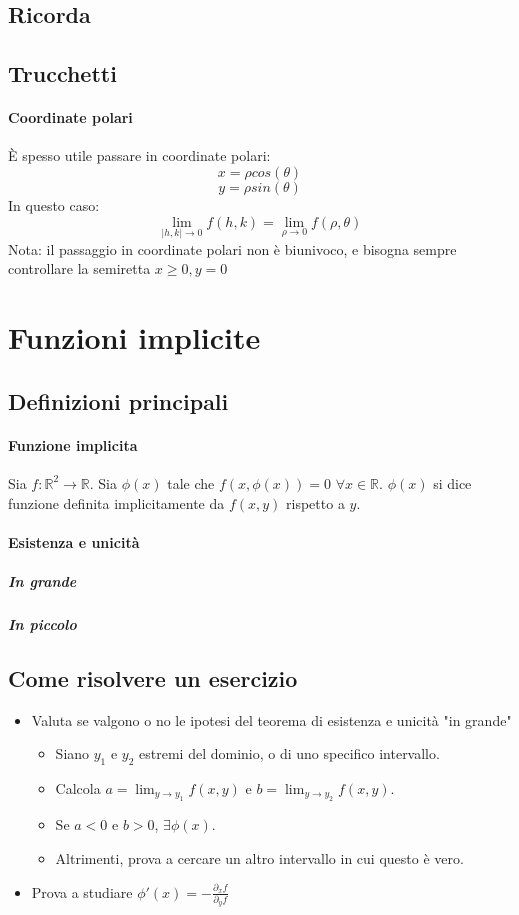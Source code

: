 \documentclass[a4paper,10pt]{book}
\begin{document}
\subsection{Ricorda}
\subsection{Trucchetti}

\paragraph{Coordinate polari}
È spesso utile passare in coordinate polari: $$ x = \rho cos(\theta)$$ $$ y = \rho sin(\theta) $$
In questo caso: $$ \lim_{|h,k| \to 0} f(h, k) = \lim_{\rho \to 0} f(\rho, \theta)$$
Nota: il passaggio in coordinate polari non è biunivoco, e bisogna sempre controllare la semiretta $x\geq0, y=0$

\section{Funzioni implicite}
\subsection{Definizioni principali}
\paragraph{Funzione implicita}
Sia $f: \mathbb{R}^2 \rightarrow \mathbb{R}$.
Sia $\phi(x)$ tale che $f(x, \phi(x)) = 0$ $\forall x \in \mathbb{R}$. $\phi(x)$ si dice funzione definita implicitamente da $f(x, y)$ rispetto a $y$.

\paragraph{Esistenza e unicità}
\subparagraph{In grande}
\subparagraph{In piccolo}

\subsection{Come risolvere un esercizio}
\begin{itemize}
 \item Valuta se valgono o no le ipotesi del teorema di esistenza e unicità "in grande"
 \begin{itemize}
  \item Siano $y_1$ e $y_2$ estremi del dominio, o di uno specifico intervallo.
  \item Calcola $a = \lim_{y \to y_1}{f(x, y)}$ e $b = \lim_{y \to y_2}{f(x, y)}$.
  \item Se $a < 0$ e $b > 0$, $\exists \phi(x)$.
  \item Altrimenti, prova a cercare un altro intervallo in cui questo è vero.
 \end{itemize}
 \item Prova a studiare $\phi'(x) = -\displaystyle\frac{\partial_x f}{\partial_y f}$
\end{itemize}
\end{document}
